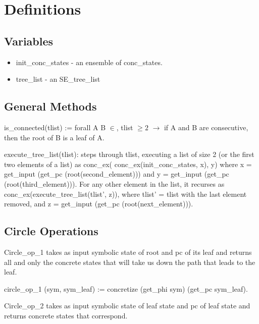 \section{Definitions}

\subsection{Variables}
\begin{itemize}
\item init\_conc\_states - an ensemble of conc\_states.
\item tree\_list - an SE\_tree\_list
\end{itemize}

\subsection{General Methods}
\begin{define}
 is\_connected(tlist) :=
 forall A B $\in$, 
 tlist $\geq 2$  $\rightarrow$
if A and B are consecutive, then the root of B is a leaf of A.
\end{define}

\begin{define}
execute\_tree\_list(tlist):  steps through tlist, 
executing a list of size 2 (or the first two elements of a list) as conc\_ex( conc\_ex(init\_conc\_states, x), y)
where x = get\_input (get\_pc (root(second\_element))) and y = get\_input (get\_pc (root(third\_element))).
For any other element in the list, it recurses as conc\_ex(execute\_tree\_list(tlist', z)), where tlist' = tlist with the last element removed, and z = get\_input (get\_pc (root(next\_element))).
\end{define}

\subsection{Circle Operations}
Circle\_op\_1 takes as input symbolic state of root and pc of its leaf 
and returns all and only the concrete states that will take us down 
the path that leads to the leaf.

\begin{define}
circle\_op\_1 (sym, sym\_leaf) :=
concretize (get\_phi sym) (get\_pc sym\_leaf).
\end{define}

Circle\_op\_2 takes as input symbolic state of leaf state and pc of leaf state 
and returns concrete states that correspond.

